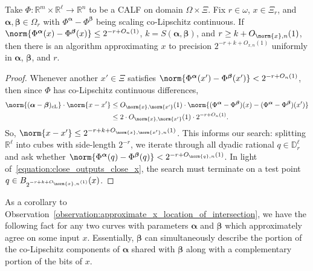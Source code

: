 \begin{observation}
    \label{observation:approximate_x_location_of_intersection}
    
    Take $\Phi : \mathbb{R}^m \times \mathbb{R}^\ell \to \mathbb{R}^n$ to be a CALF on domain $\Omega \times \Xi$. Fix $r \in \omega$, $x \in \Xi_r$, and $\boldsymbol{\alpha}, \boldsymbol{\beta} \in \Omega_r$ with $\Phi^{\boldsymbol{\alpha}} - \Phi^{\boldsymbol{\beta}}$ being scaling co-Lipschitz continuous. If $\norm{\Phi^{\boldsymbol{\alpha}}(x) - \Phi^{\boldsymbol{\beta}}(x)} \leq 2^{-r + O_n(1)}$, $k = S(\boldsymbol{\alpha}, \boldsymbol{\beta})$, and $r \geq k + O_{\norm{x}, n}(1)$, then there is an algorithm approximating $x$ to precision $2^{-r + k + O_{x, n}(1)}$ uniformly in $\boldsymbol{\alpha}$, $\boldsymbol{\beta}$, and $r$.
\end{observation}
\begin{proof}
    Whenever another $x' \in \Xi$ satisfies $\norm{\Phi^{\boldsymbol{\alpha}}(x') - \Phi^{\boldsymbol{\beta}}(x')} < 2^{-r + O_n(1)}$, then since $\Phi$ has co-Lipschitz continuous differences, 
    \begin{align}
        \norm{(\boldsymbol{\alpha} - \boldsymbol{\beta})_{\operatorname{cL}}} \cdot \norm{x - x'} &\leq O_{\norm{x}, \norm{x'}}(1) \cdot \norm{(\Phi^{\boldsymbol{\alpha}} - \Phi^{\boldsymbol{\beta}})(x) - (\Phi^{\boldsymbol{\alpha}} - \Phi^{\boldsymbol{\beta}})(x')} \nonumber \\
        &\leq 2 \cdot O_{\norm{x}, \norm{x'}}(1) \cdot 2^{-r + O_n(1)}. \label{equation:close_outputs_close_x}
    \end{align}
    So, $\norm{x - x'} \leq 2^{-r + k + O_{\norm{x}, \norm{x'}, n}(1)}$. This informs our search: splitting $\mathbb{R}^\ell$ into cubes with side-length $2^{-r}$, we iterate through all dyadic rational $q \in \mathbb{D}^\ell_r$ and ask whether $\norm{\Phi^{\boldsymbol{\alpha}}(q) - \Phi^{\boldsymbol{\beta}}(q)} < 2^{-r + O_{\norm{q}, n}(1)}$. In light of~\eqref{equation:close_outputs_close_x}, the search must terminate on a test point $q \in B_{2^{-r + k + O_{\norm{x}, n}(1)}}(x)$.
\end{proof}

As a corollary to Observation~\ref{observation:approximate_x_location_of_intersection}, we have the following fact for any two curves with parameters $\boldsymbol{\alpha}$ and $\boldsymbol{\beta}$ which approximately agree on some input $x$. Essentially, $\boldsymbol{\beta}$ can simultaneously describe the portion of the co-Lipschitz components of $\boldsymbol{\alpha}$ shared with $\boldsymbol{\beta}$ along with a complementary portion of the bits of $x$.

